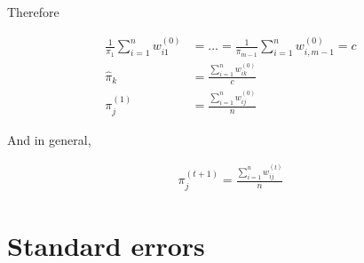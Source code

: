 \documentclass[12pt]{amsart}
\newcommand{\eqn}[1]{\begin{align*}
#1
\end{align*}}
\newcommand{\sumn}{\sum^n_{i=1}}
\begin{document}
Therefore


\eqn{
	\frac{1}{\pi_1} \sumn w^{(0)}_{i1} &= \ldots = \frac{1}{\pi_{m-1}} \sumn w^{(0)}_{i,m-1} = c	\\
	\hat{\pi}_k &= \frac{\sumn w^{(0)}_{ik}}{c}		\\
	\pi^{(1)}_j &= \frac{\sumn w^{(0)}_{ij}}{n}
}

And in general,


\eqn{
	\pi^{(t+1)}_j = \frac{\sumn w^{(t)}_{ij}}{n}
}




\clearpage
\section{Standard errors}
\end{document}
